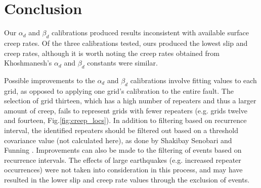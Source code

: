 \documentclass{article}
\begin{document}
\section{Conclusion}
Our $\alpha_d$ and $\beta_d$ calibrations produced results inconsistent with available surface creep rates. Of the three calibrations tested, ours produced the lowest slip and creep rates, although it is worth noting the creep rates obtained from Khoshmanesh's $\alpha_d$ and $\beta_d$ constants were similar. 

Possible improvements to the $\alpha_d$ and $\beta_d$ calibrations involve fitting values to each grid, as opposed to applying one grid's calibration to the entire fault. The selection of grid thirteen, which has a high number of repeaters and thus a larger amount of creep, fails to represent grids with fewer repeaters (e.g. grids twelve and fourteen, Fig.\ref{fig:creep_locs}).
In addition to filtering based on recurrence interval, the identified repeaters should be filtered out based on a threshold covariance value (not calculated here), as done by Shakibay Senobari and Funning \cite{shakibay19}. Improvements can also be made to the filtering of events based on recurrence intervals. The effects of large earthquakes (e.g. increased repeater occurrences) were not taken into consideration in this process, and may have resulted in the lower slip and creep rate values through the exclusion of events.

\newpage


\end{document}

